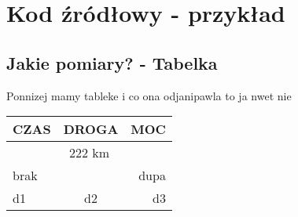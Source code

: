 \section{Kod źródłowy - przykład}




\subsection{Jakie pomiary? - Tabelka}

Ponnizej mamy tableke i co ona odjanipawla to ja nwet nie\\

\begin{center}
    \begin{tabular}{|l|c|r|}
    
        \hline
            CZAS & DROGA & MOC\\
        \hline
        \multicolumn{3}{|c|}{222 km}\\
        \hline
        brak & \multicolumn{2}{r|}{dupa}\\
        \hline
            d1 & d2 & d3\\
        \hline
    \end{tabular}
\end{center}